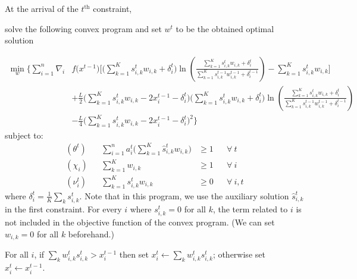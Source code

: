 At the arrival of the $t^{\text{th}}$ constraint,
\begin{compactenum}
	\item solve the following convex program and set $w^t$ to be the obtained optimal solution

\begin{align*}
\min_{w} \biggl\{\sum_{i=1}^{n}
    \nabla_{i} & f\bigl(x^{t-1} \bigr) \biggl[  \biggl(\sum_{k=1}^{K} s_{i,k}^{t} w_{i,k}  + \delta_{i}^{t} \biggr)
                     \ln \left(\frac{ \sum_{k=1}^{K} s_{i,k}^{t} w_{i,k}  + \delta_{i}^{t} }{\sum_{k=1}^{K} s_{i,k}^{t-1} w_{i,k}^{t-1} + \delta_{i}^{t-1}}\right)
                                    - \sum_{k=1}^{K}  s_{i,k}^{t} w_{i,k} \biggr] \\
            &+ \frac{L}{2}\biggl( \sum_{k=1}^{K} s_{i,k}^{t} w_{i,k}  - 2x_{i}^{t-1} - \delta_{i}^{t} \biggr) \biggl(\sum_{k=1}^{K} s_{i,k}^{t} w_{i,k} + \delta_{i}^{t} \biggr)
                \ln \left(\frac{ \sum_{k=1}^{K} s_{i,k}^{t} w_{i,k}  + \delta_{i}^{t} }{\sum_{k=1}^{K} s_{i,k}^{t-1} w_{i,k}^{t-1}  + \delta_{i}^{t-1}}\right) \\
            &- \frac{L}{4} \biggl( \sum_{k=1}^{K} s_{i,k}^{t} w_{i,k}  - 2x_{i}^{t-1} - \delta_{i}^{t} \biggr)^{2}
        \biggr\}
\end{align*}
%
\noindent subject to:
%
\begin{align*}
    (\theta^{t})  && \sum_{i=1}^{n} a_{i}^{t} \biggl( \sum_{k=1}^{K}  \hat{s}_{i,k}^{t} w_{i,k} \biggr) &\geq 1 && \forall\ t\\
%
    (\chi_{i}) && \sum_{k=1}^{K}  w_{i,k} &\geq 1 && \forall\ i\\
%
    (\nu_{i}^{t}) && \sum_{k=1}^{K} s_{i,k}^{t} w_{i,k} &\geq 0 && \forall\ i,t
\end{align*}
%
where $\delta_{i}^{t} = \frac{1}{K} \sum_{k} s_{i,k}^{t}$.
Note that in this program, we use the auxiliary solution $\hat{s}_{i,k}^{t}$ in the first constraint. For every $i$ where $s_{i,k}^{t} = 0$ for all $k$, the term related to $i$ is not included in the objective function of the convex program.
(We can set $w_{i,k} = 0$ for all $k$ beforehand.)
	\item For all $i$, if $\sum_{k} w_{i,k}^{t} s_{i,k}^{t} > x_{i}^{t-1}$ then set $x_{i}^{t} \gets \sum_{k} w_{i,k}^{t} s_{i,k}^{t}$;
otherwise set $x_{i}^{t} \gets x_{i}^{t-1}$.
\end{compactenum}


